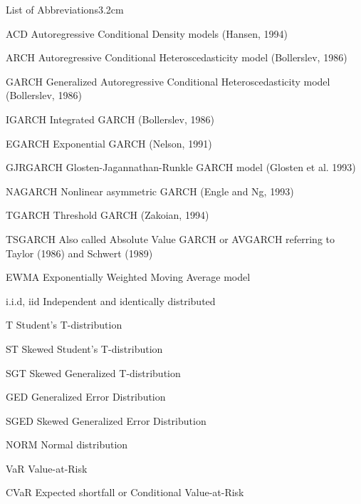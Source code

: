 \begin{mclistof}{List of Abbreviations}{3.2cm}
\item[ACD] Autoregressive Conditional Density models (Hansen, 1994)
\item[ARCH] Autoregressive Conditional Heteroscedasticity model (Bollerslev, 1986)
\item[GARCH] Generalized Autoregressive Conditional Heteroscedasticity model (Bollerslev, 1986)
\item[IGARCH] Integrated GARCH (Bollerslev, 1986)
\item[EGARCH] Exponential GARCH (Nelson, 1991)
\item[GJRGARCH] Glosten-Jagannathan-Runkle GARCH model (Glosten et al. 1993)
\item[NAGARCH] Nonlinear asymmetric GARCH (Engle and Ng, 1993)
\item[TGARCH] Threshold GARCH (Zakoian, 1994)
\item[TSGARCH] Also called Absolute Value GARCH or AVGARCH referring to Taylor (1986) and Schwert (1989)
\item[EWMA] Exponentially Weighted Moving Average model 
\item[i.i.d, iid] Independent and identically distributed
\item[T] Student's T-distribution
\item[ST] Skewed Student's T-distribution
\item[SGT] Skewed Generalized T-distribution
\item[GED] Generalized Error Distribution
\item[SGED] Skewed Generalized Error Distribution
\item[NORM] Normal distribution
\item[VaR] Value-at-Risk 
\item[CVaR] Expected shortfall or Conditional Value-at-Risk
\end{mclistof} 

